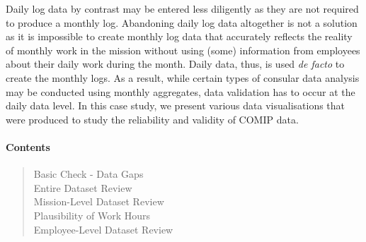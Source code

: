 Daily log data by contrast may be entered less diligently as they are not required to produce a monthly log. \newl Abandoning daily log data altogether is not a solution as it is impossible to create monthly log data that accurately reflects the reality of monthly work in the mission without using (some) information from employees about their daily work during the month. Daily data, thus, is used \textit{de facto} to create the monthly logs. \newl As a result, while certain types of consular data analysis may be conducted using monthly aggregates, data validation has to occur at the daily data level. In this case study, we present various data visualisations that were produced to study the reliability and validity of COMIP data. \newpage\noindent
\paragraph{Contents}
\begin{quote}
Basic Check - Data Gaps \\
Entire Dataset Review \\
Mission-Level Dataset Review  \\
Plausibility of Work Hours \\
Employee-Level Dataset Review 
\end{quote}

